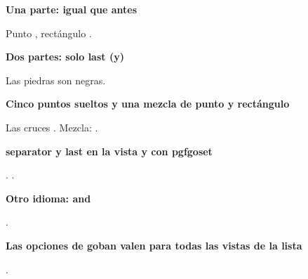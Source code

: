 \documentclass{article}
\newcommand\case[1]{\par\medskip\noindent\textbf{#1}\par\nopagebreak}
\begin{document}
\begin{goban}[9, name = lista]
\end{goban}

\case{Una parte: igual que antes}
Punto , rect\'angulo .

\case{Dos partes: solo last (y)}
Las piedras  son negras.

\case{Cinco puntos sueltos y una mezcla de punto y rect\'angulo}
Las cruces .
Mezcla: .

\case{separator y last en la vista y con pgfgoset}
.
{.}

\case{Otro idioma: and}
{.}

\case{Las opciones de goban valen para todas las vistas de la lista}
.
\end{document}
